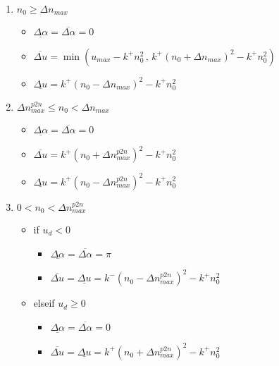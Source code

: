 \begin{enumerate}
  \item $n_0 \geq \Delta n_{max}$
  \begin{itemize}
    \item $\underline{\Delta \alpha} = \overline{\Delta \alpha} = 0$
    \item $\overline{\Delta u}= \min \left( u_{max}-k^+ n_0^2 \, , \,
    k^+ (n_0+ \Delta n_{max})^2 - k^+ n_0^2 \right)$
    \item $\underline{\Delta u}=k^+ (n_0 - \Delta n_{max})^2 - k^+ n_0^2 $
  \end{itemize}

  \item $\Delta n_{max}^{p2n} \leq n_0 < \Delta n_{max}$
  \begin{itemize}
    \item $\underline{\Delta \alpha} = \overline{\Delta \alpha} = 0$
    \item $\overline{\Delta u}= k^+ (n_0 + \Delta n_{max}^{p2n})^2 - k^+ n_0^2$
    \item $\underline{\Delta u}=k^+ (n_0 - \Delta n_{max}^{p2n})^2 - k^+ n_0^2 $
  \end{itemize}

  \item $0 < n_0 < \Delta n_{max}^{p2n}$
  \begin{itemize}
    \item if $u_d < 0$
    \begin{itemize}
      \item $\underline{\Delta \alpha} = \overline{\Delta \alpha} = \pi$
      \item $\overline{\Delta u}= \underline{\Delta u}=
      k^- (n_0 - \Delta n_{max}^{p2n})^2 - k^+ n_0^2$
    \end{itemize}
    \item elseif $u_d \geq 0$
    \begin{itemize}
      \item $\underline{\Delta \alpha} = \overline{\Delta \alpha} = 0$
      \item $\overline{\Delta u}= \underline{\Delta u}=
      k^+ (n_0 + \Delta n_{max}^{p2n})^2 - k^+ n_0^2$
    \end{itemize}
  \end{itemize}


\end{enumerate}
